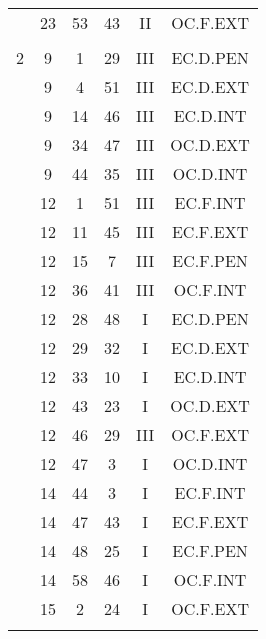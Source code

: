 \documentclass[12pt, a4paper]{article}
\begin{document}
\begin{multicols}{3}
{\begin{tabular}{c c c c c c}
	 	 	 	 & 23 & 53 & 43 & II & OC.F.EXT\\%
	 	 	 	 & & & & & \\%
	 	 	 	2 & 9 & 1 & 29 & III & EC.D.PEN\\%
	 	 	 	 & 9 & 4 & 51 & III & EC.D.EXT\\%
	 	 	 	 & 9 & 14 & 46 & III & EC.D.INT\\%
	 	 	 	 & 9 & 34 & 47 & III & OC.D.EXT\\%
	 	 	 	 & 9 & 44 & 35 & III & OC.D.INT\\%
	 	 	 	 & 12 & 1 & 51 & III & EC.F.INT\\%
	 	 	 	 & 12 & 11 & 45 & III & EC.F.EXT\\%
	 	 	 	 & 12 & 15 & 7 & III & EC.F.PEN\\%
	 	 	 	 & 12 & 36 & 41 & III & OC.F.INT\\%
	 	 	 	 & 12 & 28 & 48 & I & EC.D.PEN\\%
	 	 	 	 & 12 & 29 & 32 & I & EC.D.EXT\\%
	 	 	 	 & 12 & 33 & 10 & I & EC.D.INT\\%
	 	 	 	 & 12 & 43 & 23 & I & OC.D.EXT\\%
	 	 	 	 & 12 & 46 & 29 & III & OC.F.EXT\\%
	 	 	 	 & 12 & 47 & 3 & I & OC.D.INT\\%
	 	 	 	 & 14 & 44 & 3 & I & EC.F.INT\\%
	 	 	 	 & 14 & 47 & 43 & I & EC.F.EXT\\%
	 	 	 	 & 14 & 48 & 25 & I & EC.F.PEN\\%
	 	 	 	 & 14 & 58 & 46 & I & OC.F.INT\\%
	 	 	 	 & 15 & 2 & 24 & I & OC.F.EXT\\%
	 	 	 	 & & & & & \\%

\end{tabular}}
\end{multicols}
\end{document}

